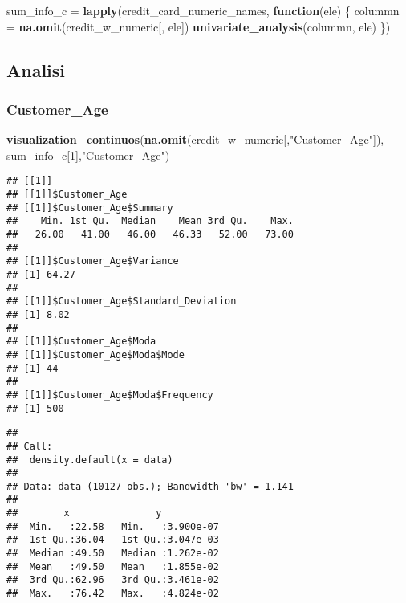 \documentclass[
]{article}
\newenvironment{Shaded}{\begin{snugshade}}{\end{snugshade}}
\newcommand{\ControlFlowTok}[1]{\textcolor[rgb]{0.13,0.29,0.53}{\textbf{#1}}}
\newcommand{\DecValTok}[1]{\textcolor[rgb]{0.00,0.00,0.81}{#1}}
\newcommand{\FunctionTok}[1]{\textcolor[rgb]{0.13,0.29,0.53}{\textbf{#1}}}
\newcommand{\NormalTok}[1]{#1}
\newcommand{\OtherTok}[1]{\textcolor[rgb]{0.56,0.35,0.01}{#1}}
\newcommand{\StringTok}[1]{\textcolor[rgb]{0.31,0.60,0.02}{#1}}
\begin{document}
\begin{Shaded}
\begin{Highlighting}[]
\NormalTok{sum\_info\_c }\OtherTok{=} \FunctionTok{lapply}\NormalTok{(credit\_card\_numeric\_names, }\ControlFlowTok{function}\NormalTok{(ele) \{}
\NormalTok{  colummn }\OtherTok{=} \FunctionTok{na.omit}\NormalTok{(credit\_w\_numeric[, ele])}
  \FunctionTok{univariate\_analysis}\NormalTok{(colummn, ele)}
\NormalTok{\})}
\end{Highlighting}
\end{Shaded}

\subsection{Analisi}\label{analisi-1}

\subsubsection{Customer\_Age}\label{customer_age}

\begin{Shaded}
\begin{Highlighting}[]
\FunctionTok{visualization\_continuos}\NormalTok{(}\FunctionTok{na.omit}\NormalTok{(credit\_w\_numeric[,}\StringTok{"Customer\_Age"}\NormalTok{]), sum\_info\_c[}\DecValTok{1}\NormalTok{],}\StringTok{"Customer\_Age"}\NormalTok{)}
\end{Highlighting}
\end{Shaded}

\begin{verbatim}
## [[1]]
## [[1]]$Customer_Age
## [[1]]$Customer_Age$Summary
##    Min. 1st Qu.  Median    Mean 3rd Qu.    Max. 
##   26.00   41.00   46.00   46.33   52.00   73.00 
## 
## [[1]]$Customer_Age$Variance
## [1] 64.27
## 
## [[1]]$Customer_Age$Standard_Deviation
## [1] 8.02
## 
## [[1]]$Customer_Age$Moda
## [[1]]$Customer_Age$Moda$Mode
## [1] 44
## 
## [[1]]$Customer_Age$Moda$Frequency
## [1] 500
\end{verbatim}

\begin{verbatim}
## 
## Call:
##  density.default(x = data)
## 
## Data: data (10127 obs.); Bandwidth 'bw' = 1.141
## 
##        x               y            
##  Min.   :22.58   Min.   :3.900e-07  
##  1st Qu.:36.04   1st Qu.:3.047e-03  
##  Median :49.50   Median :1.262e-02  
##  Mean   :49.50   Mean   :1.855e-02  
##  3rd Qu.:62.96   3rd Qu.:3.461e-02  
##  Max.   :76.42   Max.   :4.824e-02
\end{verbatim}
\end{document}
